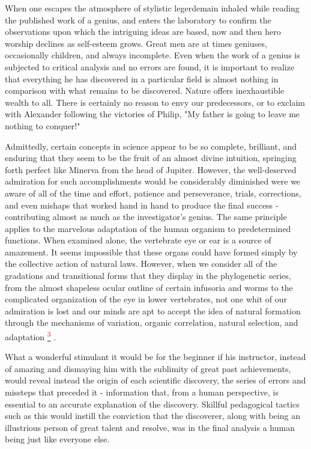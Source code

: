 \documentclass{article}
\newcommand{\noteref}[1]{%
 \hypertarget{ref:#1}{}%
 \hyperlink{note:#1}{\textsuperscript{\textcolor{red}{#1}}}%
}
\begin{document}
When one escapes the atmosphere of stylistic legerdemain inhaled while reading the published work of a genius, and enters the laboratory to confirm the observations upon which the intriguing ideas are based, now and then hero worship declines as self-esteem grows. Great men are at times geniuses, occasionally children, and always incomplete. Even when the work of a genius is subjected to critical analysis and no errors are found, it is important to realize that everything he has discovered in a particular field is almost nothing in comparison with what remains to be discovered. Nature offers inexhaustible wealth to all. There is certainly no reason to envy our predecessors, or to exclaim with Alexander following the victories of Philip, "My father is going to leave me nothing to conquer!"

Admittedly, certain concepts in science appear to be so complete, brilliant, and enduring that they seem to be the fruit of an almost divine intuition, springing forth perfect like Minerva from the head of Jupiter. However, the well-deserved admiration for such accomplishments would be considerably diminished were we aware of all of the time and effort, patience and perseverance, trials, corrections, and even mishaps that worked hand in hand to produce the final success - contributing almost as much as the investigator’s genius. The same principle applies to the marvelous adaptation of the human organism to predetermined functions. When examined alone, the vertebrate eye or ear is a source of amazement. It seems impossible that these organs could have formed simply by the collective action of natural laws. However, when we consider all of the gradations and transitional forms that they display in the phylogenetic series, from the almost shapeless ocular outline of certain infusoria and worms to the complicated organization of the eye in lower vertebrates, not one whit of our admiration is lost and our minds are apt to accept the idea of natural formation through the mechanisms of variation, organic correlation, natural selection, and adaptation\noteref{3}.

What a wonderful stimulant it would be for the beginner if his instructor, instead of amazing and dismaying him with the sublimity of great past achievements, would reveal instead the origin of each scientific discovery, the series of errors and missteps that preceded it - information that, from a human perspective, is essential to an accurate explanation of the discovery. Skillful pedagogical tactics such as this would instill the conviction that the discoverer, along with being an illustrious person of great talent and resolve, was in the final analysis a human being just like everyone else.
\end{document}
